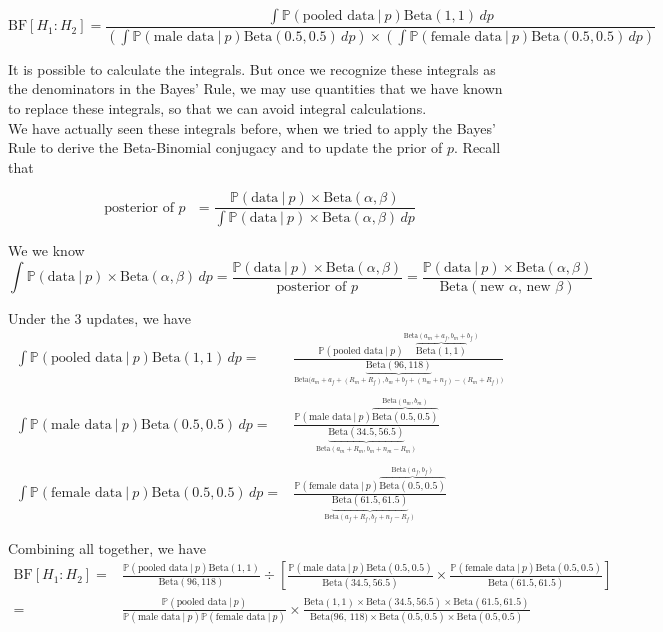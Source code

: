 \documentclass{article}
\def\dsst{\displaystyle}
\begin{document}
$$ \text{BF}[H_1:H_2] = \frac{\dsst \int \mathbb{P}(\text{pooled data}~|~p)\text{Beta}(1,1)\, dp}{\dsst \left(\int \mathbb{P}(\text{male data}~|~p)\text{Beta}(0.5, 0.5)\, dp\right)\times \left(\int \mathbb{P}(\text{female data}~|~p)\text{Beta}(0.5,0.5)\, dp\right)} $$

It is possible to calculate the integrals. But once we recognize these integrals as the denominators in the Bayes' Rule, we may use quantities that we have known to replace these integrals, so that we can avoid integral calculations.\\

We have actually seen these integrals before, when we tried to apply the Bayes' Rule to derive the Beta-Binomial conjugacy and to update the prior of $p$. Recall that

$$ \text{posterior of $p$ } = \frac{\dsst \mathbb{P}(\text{data}~|~p)\times \text{Beta}(\alpha, \beta)}{\dsst \int \mathbb{P}(\text{data}~|~p)\times \text{Beta}(\alpha, \beta)\, dp} $$

We we know
$$ \int\mathbb{P}(\text{data}~|~p)\times \text{Beta}(\alpha, \beta)\, dp = \frac{\mathbb{P}(\text{data}~|~p)\times \text{Beta}(\alpha, \beta)}{\text{posterior of $p$}} = \frac{\mathbb{P}(\text{data}~|~p)\times \text{Beta}(\alpha, \beta)}{\text{Beta}(\text{new $\alpha$, new $\beta$})} $$

Under the 3 updates, we have
\begin{align*}
\int \mathbb{P}(\text{pooled data}~|~p)\text{Beta}(1,1)\, dp = & \frac{\mathbb{P}(\text{pooled data}~|~p)\overbrace{\text{Beta}(1,1)}^\text{Beta$(a_m+a_f, b_m+b_f)$}}{\underbrace{\text{Beta}(96, 118) }_\text{Beta($a_m+a_f+(R_m+R_f), b_m+b_f+(n_m+n_f)-(R_m+R_f)$)}}\\
& \\
\int \mathbb{P}(\text{male data}~|~p)\text{Beta}(0.5, 0.5)\, dp = & \frac{\mathbb{P}(\text{male data}~|~p)\overbrace{\text{Beta}(0.5,0.5)}^\text{Beta$(a_m, b_m)$}}{\underbrace{\text{Beta}(34.5, 56.5)}_\text{Beta$(a_m+R_m, b_m+n_m-R_m)$}}\\
& \\
\int \mathbb{P}(\text{female data}~|~p)\text{Beta}(0.5, 0.5)\, dp = & \frac{\mathbb{P}(\text{female data}~|~p)\overbrace{\text{Beta}(0.5, 0.5)}^\text{Beta$(a_f, b_f)$}}{\underbrace{\text{Beta}(61.5, 61.5)}_ \text{Beta$(a_f+R_f, b_f+n_f-R_f)$}}
\end{align*}

Combining all together, we have
\begin{align*}
\text{BF}[H_1:H_2] = & \frac{\mathbb{P}(\text{pooled data}~|~p)\text{Beta}(1,1)}{\text{Beta}(96, 118)}\div\left[\frac{\mathbb{P}(\text{male data}~|~p)\text{Beta}(0.5, 0.5)}{\text{Beta}(34.5, 56.5)}\times \frac{\mathbb{P}(\text{female data}~|~p)\text{Beta}(0.5, 0.5)}{\text{Beta}(61.5, 61.5)}\right]\\
= & \frac{\mathbb{P}(\text{pooled data}~|~p)}{\mathbb{P}(\text{male data}~|~p)\mathbb{P}(\text{female data}~|~p)}\times \frac{\text{Beta}(1,1)\times \text{Beta}(34.5, 56.5)\times \text{Beta}(61.5, 61.5)}{\text{Beta(96, 118)}\times \text{Beta}(0.5, 0.5)\times \text{Beta}(0.5, 0.5)}
\end{align*}
\end{document}
